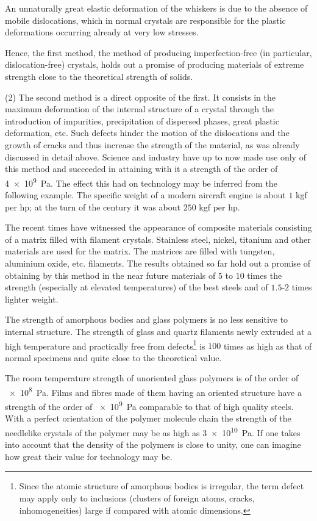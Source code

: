 An unnaturally great elastic deformation of the whiskers is due to the absence of mobile dislocations, which in normal crystals are responsible for the plastic deformations occurring already at very low stresses.

Hence, the first method, the method of producing imperfection-free (in particular, dislocation-free) crystals, holds out a promise of producing materials of extreme strength close to the theoretical strength of solids.

(2) The second method is a direct opposite of the first. It consists in the maximum deformation of the internal structure of a crystal through the introduction of impurities, precipitation of dispersed phases, great plastic deformation, etc. Such defects hinder the motion of the dislocations and the growth of cracks and thus increase the strength of the material, as was already discussed in detail above. Science and industry have up to now made use only of this method and succeeded in attaining with it a strength of the order of \SI{4e9}{\pascal}. The effect this had on technology may be inferred from the following example. The specific weight of a modern aircraft engine is about $1$ kgf per hp; at the turn of the century it was about $250$ kgf per hp.

The recent times have witnessed the appearance of composite materials consisting of a matrix filled with filament crystals. Stainless steel, nickel, titanium and other materials are used for the matrix. The matrices are filled with tungsten, aluminium oxide, etc. filaments. The results obtained so far hold out a promise of obtaining by this method in the near future materials of $5$ to $10$ times the strength (especially at elevated temperatures) of the best steels and of $1.5$-$2$ times lighter weight.

The strength of amorphous bodies and glass polymers is no less sensitive to internal structure. The strength of glass and quartz filaments newly extruded at a high temperature and practically free from defects\footnote{Since the atomic structure of amorphous bodies is irregular, the term defect may apply only to inclusions (clusters of foreign atoms, cracks, inhomogeneities) large if compared with atomic dimensions.} is $100$ times as high as that of normal specimens and quite close to the theoretical value.

The room temperature strength of unoriented glass polymers is of the order of \SI{e8}{\pascal}. Films and fibres made of them having an oriented structure have a strength of the order of \SI{e9}{\pascal} comparable to that of high quality steels. With a perfect orientation of the polymer molecule chain the strength of the needlelike crystals of the polymer may be as high as \SI{3e10}{\pascal}. If one takes into account that the density of the polymers is close to unity, one can imagine how great their value for technology may be.

